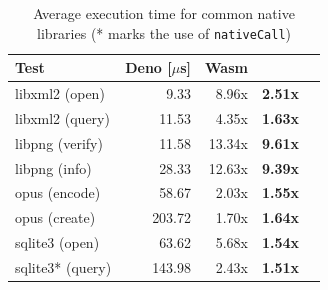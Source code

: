 \begin{table}[!t]
	\centering
	\setlength{\tabcolsep}{3.2mm}
	\begin{tabular*}{0.7\columnwidth}{l r r r r}
		\toprule
		{\bf Test} & {\bf Deno \scriptsize{[$\mu$s]}} & {\bf Wasm} & {\bf \pap}\\
		\midrule
		libxml2 (open)  & 9.33      & 8.96x     & \bf{2.51x}    \\
		libxml2 (query)	& 11.53     & 4.35x     & \bf{1.63x}    \\
		libpng (verify) & 11.58     & 13.34x    & \bf{9.61x}    \\
		libpng (info)   & 28.33     & 12.63x    & \bf{9.39x}    \\
		opus (encode)   & 58.67     & 2.03x     & \bf{1.55x}    \\
		opus (create)   & 203.72    & 1.70x     & \bf{1.64x}    \\         
		sqlite3 (open)  & 63.62     & 5.68x     & \bf{1.54x}    \\
		sqlite3* (query) & 143.98    & 2.43x     & \bf{1.51x}    \\ 

		\bottomrule
	\end{tabular*}
	\caption[Average execution time for common native libraries]{
		\label{table:native-lib-overhead} Average execution time for
		common native libraries (* marks the use of {\tt nativeCall})
	}
\end{table}
%
